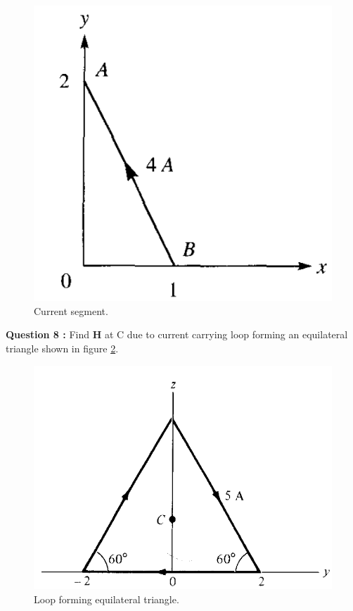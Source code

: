 \documentclass[12pt,a4paper]{article}
\begin{document}
\begin{figure}[H]
\centering
\includegraphics[scale=0.45]{Figure7-27S.png}
\caption{Current segment.}
\label{AB-segment2}
\end{figure}
\noindent\textbf{Question 8 \cite[Problem 7.8, page 298]{Sadiku}:} Find \textbf{H} at C due to current carrying loop forming an equilateral triangle shown in figure \ref{equilateral-wires}.\\
\begin{figure}[H]
\centering
\includegraphics[scale=0.4]{Figure7-29S.png}
\caption{Loop forming equilateral triangle.}
\label{equilateral-wires}
\end{figure}
\end{document}
